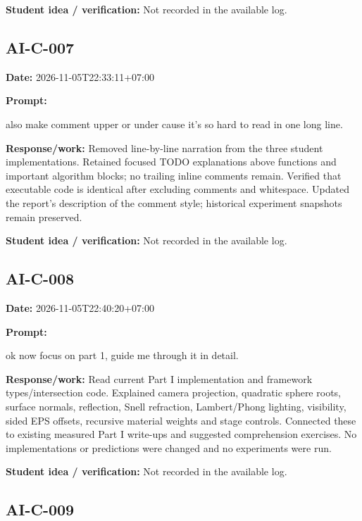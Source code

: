 \documentclass[11pt,a4paper]{article}
\begin{document}
\noindent\textbf{Student idea / verification:} Not recorded in the available log.\par\medskip
{}\subsection*{AI-C-007}
\noindent\textbf{Date:} 2026-11-05T22:33:11+07:00\par
\noindent\textbf{Prompt:}
\begin{prompt}
also make comment upper or under cause it's so hard to read in one long line.
\end{prompt}
\noindent\textbf{Response/work:} Removed line-by-line narration from the three student implementations. Retained focused TODO explanations above functions and important algorithm blocks; no trailing inline comments remain. Verified that executable code is identical after excluding comments and whitespace. Updated the report's description of the comment style; historical experiment snapshots remain preserved.\par
\noindent\textbf{Student idea / verification:} Not recorded in the available log.\par\medskip
{}\subsection*{AI-C-008}
\noindent\textbf{Date:} 2026-11-05T22:40:20+07:00\par
\noindent\textbf{Prompt:}
\begin{prompt}
ok now focus on part 1, guide me through it in detail.
\end{prompt}
\noindent\textbf{Response/work:} Read current Part I implementation and framework types/\allowbreak{}intersection code. Explained camera projection, quadratic sphere roots, surface normals, reflection, Snell refraction, Lambert/\allowbreak{}Phong lighting, visibility, sided EPS offsets, recursive material weights and stage controls. Connected these to existing measured Part I write-ups and suggested comprehension exercises. No implementations or predictions were changed and no experiments were run.\par
\noindent\textbf{Student idea / verification:} Not recorded in the available log.\par\medskip
{}\subsection*{AI-C-009}
\end{document}
